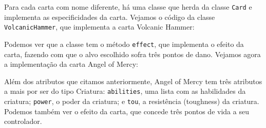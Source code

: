 Para cada carta com nome diferente, há uma classe que herda da classe \texttt{Card} e implementa
as especificidades da carta. Vejamos o código da classe \texttt{VolcanicHammer}, que implementa
a carta Volcanic Hammer:
\begin{figure}
  
\end{figure}
Podemos ver que a classe tem o método \texttt{effect}, que implementa o efeito da carta,
fazendo com que o alvo escolhido sofra três pontos de dano. Vejamos agora a implementação
da carta Angel of Mercy:
\begin{figure}
  
\end{figure}
Além dos atributos que citamos anteriormente, Angel of Mercy tem três atributos a mais por
ser do tipo Criatura: \texttt{abilities}, uma lista com as habilidades da criatura;
\texttt{power}, o poder da criatura; e \texttt{tou}, a resistência (toughness) da criatura.
Podemos também ver o efeito da carta, que concede três pontos de vida a seu controlador.

